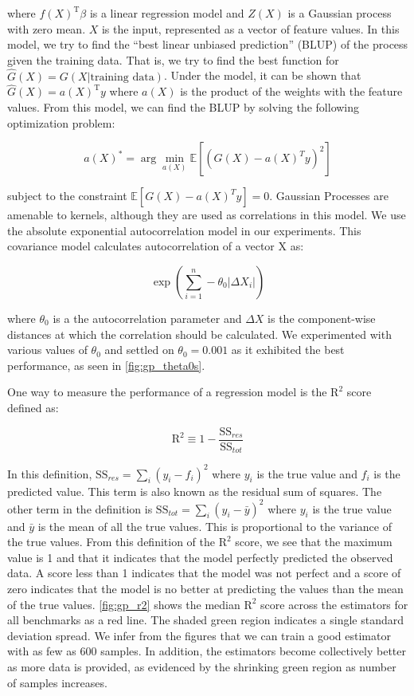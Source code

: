where $f(X)^{\textrm{T}}\beta$ is a linear regression model and $Z(X)$
is a Gaussian process with zero mean. $X$ is the input, represented as
a vector of feature values.  In this model, we try to find the ``best
linear unbiased prediction'' (BLUP) of the process given the training
data. That is, we try to find the best function for
$\hat{G}(X) = G(X|\textrm{training data})$. Under the model, it can be
shown that $\hat{G}(X) = a(X)^{\textrm{T}}y$ where $a(X)$ is the
product of the weights with the feature values. From this model, we
can find the BLUP by solving the following optimization problem:

\begin{equation*}
a(X)^* = \arg \min\limits_{a(X)} \mathbb{E}[(G(X) - a(X)^T y)^2]
\end{equation*}

subject to the constraint $\mathbb{E}[G(X) - a(X)^T y] = 0$. Gaussian
Processes are amenable to kernels, although they are used as
correlations in this model. We use the absolute exponential
autocorrelation model in our experiments. This covariance model
calculates autocorrelation of a vector X as:

\begin{equation*}
  \exp\left( \sum_{i = 1}^n -\theta_0 |\Delta X_i| \right)
\end{equation*}

where $\theta_0$ is a the autocorrelation parameter and $\Delta X$ is
the component-wise distances at which the correlation should be
calculated. We experimented with various values of $\theta_0$ and
settled on $\theta_0 = 0.001$ as it exhibited the best performance, as
seen in \cref{fig:gp_theta0s}.

One way to measure the performance of a regression model is the
$\textrm{R}^2$ score defined as:

\begin{equation*}
  \textrm{R}^2 \equiv 1 - \frac{\textrm{SS}_{res}}{\textrm{SS}_{tot}}
\end{equation*}

In this definition, $\textrm{SS}_{res} = \sum_i (y_i - f_i)^2$ where
$y_i$ is the true value and $f_i$ is the predicted value. This term is
also known as the residual sum of squares. The other term in the
definition is $\textrm{SS}_{tot} = \sum_i (y_i - \bar{y})^2$ where
$y_i$ is the true value and $\bar{y}$ is the mean of all the true
values. This is proportional to the variance of the true values. From
this definition of the $\textrm{R}^2$ score, we see that the maximum
value is 1 and that it indicates that the model perfectly predicted
the observed data. A score less than 1 indicates that the model was
not perfect and a score of zero indicates that the model is no better
at predicting the values than the mean of the true
values. \cref{fig:gp_r2} shows
the median $\textrm{R}^2$ score across the estimators for all
benchmarks as a red line. The shaded green region indicates a single
standard deviation spread. We infer from the figures that we can
train a good estimator with as few as 600 samples. In
addition, the estimators become collectively better as more data is
provided, as evidenced by the shrinking green region as number of
samples increases.

